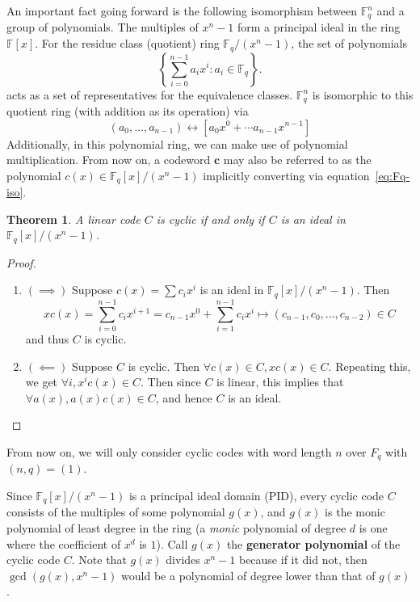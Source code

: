 \documentclass{article}
\newcommand{\F}{\mathbb{F}}
\newcommand{\mt}{\mapsto}
\renewcommand{\=}{\equiv}
\newcommand{\set}[1]{\left\{ #1 \right\}}
\renewcommand{\v}{\mathbf}
\theoremstyle{plain}
\newtheorem{thm}{Theorem}[subsection]
\theoremstyle{definition}
\begin{document}
An important fact going forward is the following isomorphism between $\F_q^n$ and a group of polynomials.
The multiples of $x^n - 1$ form a principal ideal in the ring $\F[x]$.
For the residue class (quotient) ring $\F_q / (x^n - 1)$, the set of polynomials
$$ \set{ \sum_{i=0}^{n-1} a_i x^i : a_i \in \F_q }. $$
acts as a set of representatives for the equivalence classes.
$\F_q^n$ is isomorphic to this quotient ring (with addition as its operation) via
\begin{equation}
  \label{eq:Fq-iso}
  (a_0, \dots, a_{n-1}) \leftrightarrow [a_0 x^0 + \cdots a_{n-1} x^{n-1}]
\end{equation}
Additionally, in this polynomial ring, we can make use of polynomial multiplication.
From now on, a codeword $\v c$ may also be referred to as the polynomial $c(x) \in \F_q[x] / (x^n-1)$ implicitly converting via equation~\ref{eq:Fq-iso}.

\begin{thm}
A linear code $C$ is cyclic if and only if $C$ is an ideal in $\F_q[x]/(x^n-1)$.
\end{thm}
\begin{proof}\hspace{0em}
\begin{enumerate}
\item[]
$(\implies)$
Suppose $c(x) = \sum c_i x^i$ is an ideal in $\F_q[x]/(x^n-1)$.
Then
$$ x c(x) = \sum_{i=0}^{n-1} c_i x^{i+1} = c_{n-1} x^0 + \sum_{i=1}^{n-1} c_i x^{i} \mt (c_{n-1}, c_0, \dots, c_{n-2}) \in C $$
and thus $C$ is cyclic.

\item[]
$(\impliedby)$
Suppose $C$ is cyclic.
Then $\forall c(x) \in C, x c(x) \in C$.
Repeating this, we get $\forall i, x^i c(x) \in C$.
Then since $C$ is linear, this implies that $\forall a(x), a(x) c(x) \in C$,
and hence $C$ is an ideal.
\end{enumerate}
\end{proof}

\noindent
From now on, we will only consider cyclic codes with word length $n$ over $F_q$ with $(n, q) = (1)$.
\vspace{1em}

Since $\F_q[x]/(x^n-1)$ is a principal ideal domain (PID), every cyclic code $C$ consists of the multiples of some polynomial $g(x)$, and $g(x)$ is the monic polynomial of least degree in the ring (a \textit{monic} polynomial of degree $d$ is one where the coefficient of $x^d$ is $1$).
Call $g(x)$ the \textbf{generator polynomial} of the cyclic code $C$.
Note that $g(x)$ divides $x^n-1$ because if it did not, then $\gcd(g(x), x^n-1)$ would be a polynomial of degree lower than that of $g(x)$.
\end{document}
